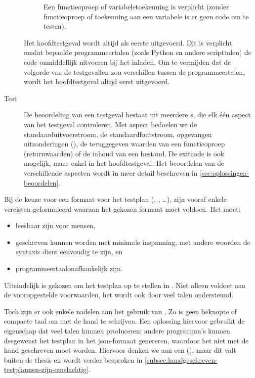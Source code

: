 \begin{description}
\begin{description}
        Een functieoproep of variabeletoekenning is verplicht (zonder functieoproep of toekenning aan een variabele is er geen code om te testen).
    \end{description}
    Het hoofdtestgeval wordt altijd als eerste uitgevoerd.
    Dit is verplicht omdat bepaalde programmeertalen (zoals Python en andere scripttalen) de code onmiddellijk uitvoeren bij het inladen.
    Om te vermijden dat de volgorde van de testgevallen zou verschillen tussen de programmeertalen, wordt het hoofdtestgeval altijd eerst uitgevoerd.
    \item[Test] De beoordeling van een testgeval bestaat uit meerdere s, die elk één aspect van het testgeval controleren.
    Met aspect bedoelen we de standaarduitvoerstroom, de standaardfoutstroom, opgevangen uitzonderingen (), de teruggegeven waarden van een functieoproep (returnwaarden) of de inhoud van een bestand.
    De exitcode is ook mogelijk, maar enkel in het hoofdtestgeval.
    Het beoordelen van de verschillende aspecten wordt in meer detail beschreven in \cref{sec:oplossingen-beoordelen}.
\end{description}

Bij de keuze voor een formaat voor het testplan (, , \ldots), zijn vooraf enkele vereisten geformuleerd waaraan het gekozen formaat moet voldoen.
Het moet:

\begin{itemize}
    \item leesbaar zijn voor mensen,
    \item geschreven kunnen worden met minimale inspanning, met andere woorden de syntaxis dient eenvoudig te zijn, en
    \item programmeertaalonafhankelijk zijn.
\end{itemize}

Uiteindelijk is gekozen om het testplan op te stellen in .
Niet alleen voldoet  aan de vooropgestelde voorwaarden, het wordt ook door veel talen ondersteund.

Toch zijn er ook enkele nadelen aan het gebruik van .
Zo is  geen beknopte of compacte taal om met de hand te schrijven.
Een oplossing hiervoor gebruikt de eigenschap dat veel talen  kunnen produceren: andere programma's kunnen desgewenst het testplan in het json-formaat genereren, waardoor het niet met de hand geschreven moet worden.
Hiervoor denken we aan een  (), maar dit valt buiten de thesis en wordt verder besproken in \cref{subsec:handgeschreven-testplannen-zijn-omslachtig}.

